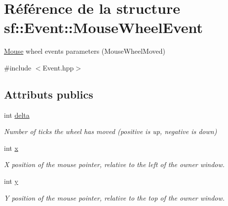 \hypertarget{structsf_1_1Event_1_1MouseWheelEvent}{}\section{Référence de la structure sf\+:\+:Event\+:\+:Mouse\+Wheel\+Event}
\label{structsf_1_1Event_1_1MouseWheelEvent}


\hyperlink{classsf_1_1Mouse}{Mouse} wheel events parameters (Mouse\+Wheel\+Moved)  




{\ttfamily \#include $<$Event.\+hpp$>$}

\subsection*{Attributs publics}
\begin{DoxyCompactItemize}
\item 
\mbox{\label{structsf_1_1Event_1_1MouseWheelEvent_a4d02b524b5530c7863e7b0f211fa522c}} 
int \hyperlink{structsf_1_1Event_1_1MouseWheelEvent_a4d02b524b5530c7863e7b0f211fa522c}{delta}
\begin{DoxyCompactList}\small\item\em Number of ticks the wheel has moved (positive is up, negative is down) \end{DoxyCompactList}\item 
\mbox{\label{structsf_1_1Event_1_1MouseWheelEvent_a3079803f836ed7208f43b60332ab053e}} 
int \hyperlink{structsf_1_1Event_1_1MouseWheelEvent_a3079803f836ed7208f43b60332ab053e}{x}
\begin{DoxyCompactList}\small\item\em X position of the mouse pointer, relative to the left of the owner window. \end{DoxyCompactList}\item 
\mbox{\label{structsf_1_1Event_1_1MouseWheelEvent_a7ea1b8d8c28e2f530c6e9e6d9a5d32d3}} 
int \hyperlink{structsf_1_1Event_1_1MouseWheelEvent_a7ea1b8d8c28e2f530c6e9e6d9a5d32d3}{y}
\begin{DoxyCompactList}\small\item\em Y position of the mouse pointer, relative to the top of the owner window. \end{DoxyCompactList}\end{DoxyCompactItemize}


